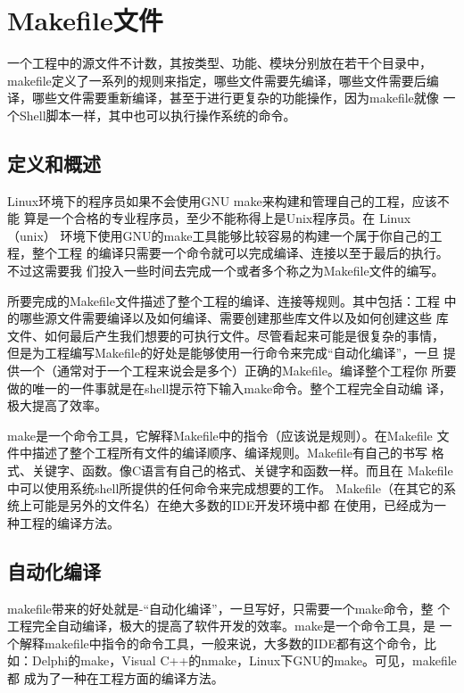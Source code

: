 \chapter{Makefile文件}
\label{sec:makefile}

一个工程中的源文件不计数，其按类型、功能、模块分别放在若干个目录中，
makefile定义了一系列的规则来指定，哪些文件需要先编译，哪些文件需要后编
译，哪些文件需要重新编译，甚至于进行更复杂的功能操作，因为makefile就像
一个Shell脚本一样，其中也可以执行操作系统的命令。

\section{定义和概述}

Linux环境下的程序员如果不会使用GNU make来构建和管理自己的工程，应该不能
算是一个合格的专业程序员，至少不能称得上是Unix程序员。在 Linux（unix）
环境下使用GNU的make工具能够比较容易的构建一个属于你自己的工程，整个工程
的编译只需要一个命令就可以完成编译、连接以至于最后的执行。不过这需要我
们投入一些时间去完成一个或者多个称之为Makefile文件的编写。

所要完成的Makefile文件描述了整个工程的编译、连接等规则。其中包括：工程
中的哪些源文件需要编译以及如何编译、需要创建那些库文件以及如何创建这些
库文件、如何最后产生我们想要的可执行文件。尽管看起来可能是很复杂的事情，
但是为工程编写Makefile的好处是能够使用一行命令来完成“自动化编译”，一旦
提供一个（通常对于一个工程来说会是多个）正确的Makefile。编译整个工程你
所要做的唯一的一件事就是在shell提示符下输入make命令。整个工程完全自动编
译，极大提高了效率。

make是一个命令工具，它解释Makefile中的指令（应该说是规则）。在Makefile
文件中描述了整个工程所有文件的编译顺序、编译规则。Makefile有自己的书写
格式、关键字、函数。像C语言有自己的格式、关键字和函数一样。而且在
Makefile中可以使用系统shell所提供的任何命令来完成想要的工作。
Makefile（在其它的系统上可能是另外的文件名）在绝大多数的IDE开发环境中都
在使用，已经成为一种工程的编译方法。

\section{自动化编译}

makefile带来的好处就是\--“自动化编译”，一旦写好，只需要一个make命令，整
个工程完全自动编译，极大的提高了软件开发的效率。make是一个命令工具，是
一个解释makefile中指令的命令工具，一般来说，大多数的IDE都有这个命令，比
如：Delphi的make，Visual C++的nmake，Linux下GNU的make。可见，makefile都
成为了一种在工程方面的编译方法。

